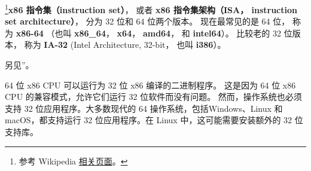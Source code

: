 
\begin{issues}
\issueDraft
\end{issues}

\footnote{参考 Wikipedia \href{https://en.wikipedia.org/wiki/X86-64}{相关页面}。}\textbf{x86 指令集（instruction set）}， 或者 \textbf{x86 指令集架构（ISA， instruction set architecture）}， 分为 32 位和 64 位两个版本。 现在最常见的是 64 位， 称为 \textbf{x86-64} （也叫 \textbf{x86_64}， \textbf{x64}， \textbf{amd64}， 和 \textbf{intel64}）。 比较老的 32 位版本， 称为 \textbf{IA-32} (Intel Architecture, 32-bit， 也叫 \textbf{i386}）。

另见”。

64 位 x86 CPU 可以运行为 32 位 x86 编译的二进制程序。 这是因为 64 位 x86 CPU 的兼容模式，允许它们运行 32 位软件而没有问题。 然而，操作系统也必须支持 32 位应用程序。大多数现代的 64 操作系统，包括Windows、Linux 和 macOS，都支持运行 32 位应用程序。在 Linux 中，这可能需要安装额外的 32 位支持库。
